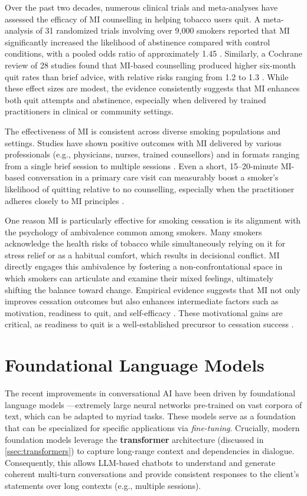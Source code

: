 Over the past two decades, numerous clinical trials and meta-analyses have assessed the efficacy of MI counselling in helping tobacco users quit. A meta-analysis of 31 randomized trials involving over 9,000 smokers reported that MI significantly increased the likelihood of abstinence compared with control conditions, with a pooled odds ratio of approximately 1.45 \cite{Heckman2010}. Similarly, a Cochrane review of 28 studies found that MI-based counselling produced higher six-month quit rates than brief advice, with relative risks ranging from 1.2 to 1.3 \cite{Lindson2015}. While these effect sizes are modest, the evidence consistently suggests that MI enhances both quit attempts and abstinence, especially when delivered by trained practitioners in clinical or community settings.

The effectiveness of MI is consistent across diverse smoking populations and settings. Studies have shown positive outcomes with MI delivered by various professionals (e.g., physicians, nurses, trained counsellors) and in formats ranging from a single brief session to multiple sessions \cite{Lindson2015}. Even a short, 15--20-minute MI-based conversation in a primary care visit can measurably boost a smoker’s likelihood of quitting relative to no counselling, especially when the practitioner adheres closely to MI principles \cite{zanjani2008effectiveness}.


One reason MI is particularly effective for smoking cessation is its alignment with the psychology of ambivalence common among smokers. Many smokers acknowledge the health risks of tobacco while simultaneously relying on it for stress relief or as a habitual comfort, which results in decisional conflict. MI directly engages this ambivalence by fostering a non-confrontational space in which smokers can articulate and examine their mixed feelings, ultimately shifting the balance toward change. Empirical evidence suggests that MI not only improves cessation outcomes but also enhances intermediate factors such as motivation, readiness to quit, and self-efficacy \cite{Boudreaux2012, Hettema2005}. These motivational gains are critical, as readiness to quit is a well-established precursor to cessation success \cite{West2006}.




\section{Foundational Language Models} \label{sec:foundational_models}
The recent improvements in conversational AI have been driven by foundational language models \cite{stanfordCRFM2021}—extremely large neural networks pre-trained on vast corpora of text, which can be adapted to myriad tasks. These models serve as a foundation that can be specialized for specific applications via \emph{fine-tuning}. Crucially, modern foundation models leverage the \textbf{transformer} architecture (discussed in \cref{ssec:transformers}) to capture long-range context and dependencies in dialogue. Consequently, this allows LLM-based chatbots to understand and generate coherent multi-turn conversations and provide consistent responses to the client’s statements over long contexts (e.g., multiple sessions).

